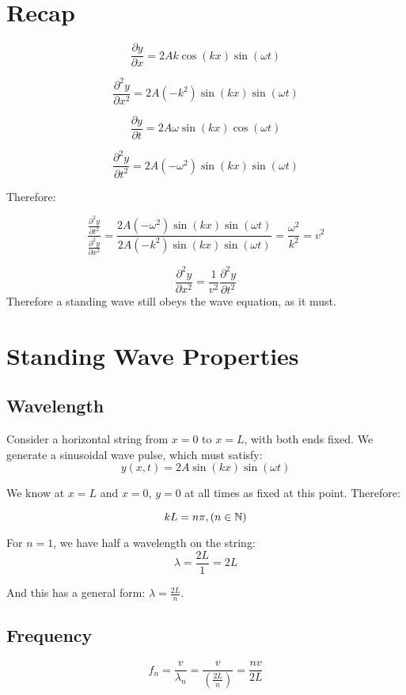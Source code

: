 
\section*{Recap}
\[
    \frac{\partial y}{\partial x} = 2 A k \cos(kx) \sin(\omega t)
\]

\[
    \frac{\partial^2 y}{\partial x^2} = 2 A(-k^2) \sin (kx) \sin (\omega t)
\]

\[
    \frac{\partial y}{\partial t} = 2 A \omega \sin (kx) \cos (\omega t)
\]

\[
    \frac{\partial ^2 y}{\partial t^2} = 2A(-\omega^2)\sin (kx) \sin (\omega t)
\]

Therefore:

\[
  \frac{\frac{\partial^2 y}{\partial t^2}}{\frac{\partial^2 y}{\partial x^2}} = \frac{2A(-\omega^2)\sin (kx) \sin (\omega t)}{2A(-k^2)\sin (kx) \sin (\omega t)} = \frac{\omega^2}{k^2} = v^2  
\]

\[
    \frac{\partial^2 y}{\partial x^2} =  \frac{1}{v^2} \frac{\partial^2 y}{\partial t^2}
\]
Therefore a standing wave still obeys the wave equation, as it must.


\section*{Standing Wave Properties}
\subsection*{Wavelength}
Consider a horizontal string from $x = 0$ to $x = L$, with both ends fixed. We generate a sinusoidal wave pulse, which must satisfy:
\[
    y(x, t) = 2A \sin(kx) \sin(\omega t)
\]

We know at $x = L$ and $x = 0$, $y = 0$ at all times as fixed at this point. Therefore:

$$kL = n \pi, (n \in \mathbb{N})$$

For $n = 1$, we have half a wavelength on the string:
\[
    \lambda = \frac{2L}{1} = 2L
\]

And this has a general form: $\lambda = \frac{2L}{n}$.

\subsection*{Frequency}
\[
    f_n = \frac{v}{\lambda_n} = \frac{v}{\left(\frac{2L}{n}\right)} = \frac{nv}{2L}
\]

